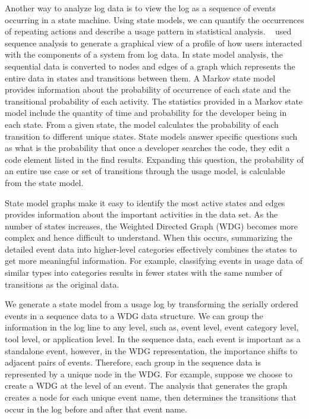 Another way to analyze log data is to view the log as a sequence of events occurring in a state machine.  Using state models, we can quantify the occurrences of repeating actions and describe a usage pattern in statistical analysis.  ~\citet{nagappanlogstodagstefse2011} used sequence analysis to generate a graphical view of a profile of how users interacted with the components of a system from log data.  In state model analysis, the sequential data is converted to nodes and edges of a graph which represents the entire data in states and transitions between them.  A Markov state model provides information about the probability of occurrence of each state and the transitional probability of each activity.   The statistics provided in a Markov state model include the quantity of time and probability for the developer being in each state.  From a given state, the model calculates the probability of each transition to different unique states.  State models answer specific questions such as what is the probability that once a developer searches the code, they edit a code element listed in the find results. Expanding this question, the probability of an entire use case or set of transitions through the usage model, is calculable from the state model.  

State model graphs make it easy to identify the most active states and edges provides information about the important activities in the data set.  As the number of states increases, the Weighted Directed Graph (WDG) becomes more complex and hence difficult to understand.  When this occurs, summarizing the detailed event data into higher-level categories effectively combines the states to get more meaningful information.   For example, classifying events in usage data of similar types into categories results in fewer states with the same number of transitions as the original data.

We generate a state model from a usage log by transforming the serially ordered events in a sequence data to a WDG data structure. We can group the information in the log line to any level, such as, event level, event category level, tool level, or application level. In the sequence data, each event is important as a standalone event, however, in the WDG representation, the importance shifts to adjacent pairs of events. 
Therefore, each group in the sequence data is represented by a unique node in the WDG.  For example, suppose we choose to create a WDG at the level of an event.  The analysis that generates the graph creates a node for each unique event name, then determines the transitions that occur in the log before and after that event name.

